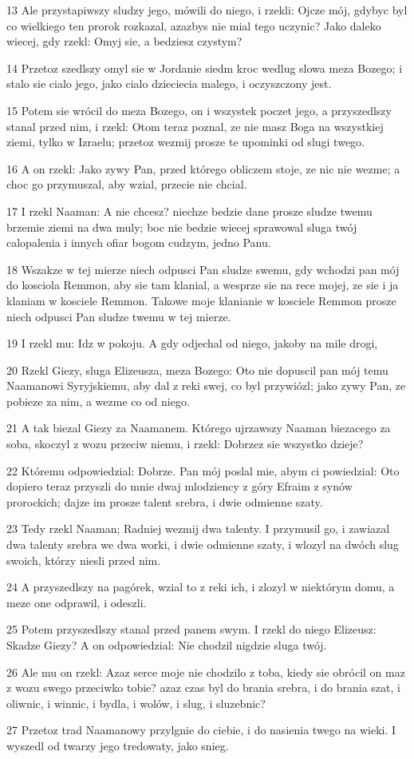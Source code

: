 \par 13 Ale przystapiwszy sludzy jego, mówili do niego, i rzekli: Ojcze mój, gdybyc byl co wielkiego ten prorok rozkazal, azazbys nie mial tego uczynic? Jako daleko wiecej, gdy rzekl: Omyj sie, a bedziesz czystym?
\par 14 Przetoz szedlszy omyl sie w Jordanie siedm kroc wedlug slowa meza Bozego; i stalo sie cialo jego, jako cialo dzieciecia malego, i oczyszczony jest.
\par 15 Potem sie wrócil do meza Bozego, on i wszystek poczet jego, a przyszedlszy stanal przed nim, i rzekl: Otom teraz poznal, ze nie masz Boga na wszystkiej ziemi, tylko w Izraelu; przetoz wezmij prosze te upominki od slugi twego.
\par 16 A on rzekl: Jako zywy Pan, przed którego obliczem stoje, ze nic nie wezme; a choc go przymuszal, aby wzial, przecie nie chcial.
\par 17 I rzekl Naaman: A nie chcesz? niechze bedzie dane prosze sludze twemu brzemie ziemi na dwa muly; boc nie bedzie wiecej sprawowal sluga twój calopalenia i innych ofiar bogom cudzym, jedno Panu.
\par 18 Wszakze w tej mierze niech odpusci Pan sludze swemu, gdy wchodzi pan mój do kosciola Remmon, aby sie tam klanial, a wesprze sie na rece mojej, ze sie i ja klaniam w kosciele Remmon. Takowe moje klanianie w kosciele Remmon prosze niech odpusci Pan sludze twemu w tej mierze.
\par 19 I rzekl mu: Idz w pokoju. A gdy odjechal od niego, jakoby na mile drogi,
\par 20 Rzekl Giezy, sluga Elizeusza, meza Bozego: Oto nie dopuscil pan mój temu Naamanowi Syryjskiemu, aby dal z reki swej, co byl przywiózl; jako zywy Pan, ze pobieze za nim, a wezme co od niego.
\par 21 A tak biezal Giezy za Naamanem. Którego ujrzawszy Naaman biezacego za soba, skoczyl z wozu przeciw niemu, i rzekl: Dobrzez sie wszystko dzieje?
\par 22 Któremu odpowiedzial: Dobrze. Pan mój poslal mie, abym ci powiedzial: Oto dopiero teraz przyszli do mnie dwaj mlodziency z góry Efraim z synów prorockich; dajze im prosze talent srebra, i dwie odmienne szaty.
\par 23 Tedy rzekl Naaman; Radniej wezmij dwa talenty. I przymusil go, i zawiazal dwa talenty srebra we dwa worki, i dwie odmienne szaty, i wlozyl na dwóch slug swoich, którzy niesli przed nim.
\par 24 A przyszedlszy na pagórek, wzial to z reki ich, i zlozyl w niektórym domu, a meze one odprawil, i odeszli.
\par 25 Potem przyszedlszy stanal przed panem swym. I rzekl do niego Elizeusz: Skadze Giezy? A on odpowiedzial: Nie chodzil nigdzie sluga twój.
\par 26 Ale mu on rzekl: Azaz serce moje nie chodzilo z toba, kiedy sie obrócil on maz z wozu swego przeciwko tobie? azaz czas byl do brania srebra, i do brania szat, i oliwnic, i winnic, i bydla, i wolów, i slug, i sluzebnic?
\par 27 Przetoz trad Naamanowy przylgnie do ciebie, i do nasienia twego na wieki. I wyszedl od twarzy jego tredowaty, jako snieg.

